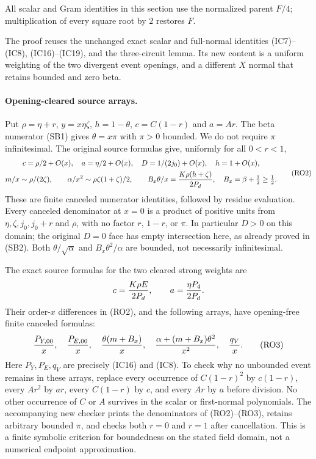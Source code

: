 All scalar and Gram identities in this section use the normalized
parent $F/4$; multiplication of every square root by $2$ restores $F$.

The proof reuses the unchanged exact scalar and full-normal identities
(IC7)--(IC8), (IC16)--(IC19), and the three-circuit lemma. Its new
content is a uniform weighting of the two divergent event openings,
and a different $X$ normal that retains bounded and zero beta.

\paragraph{Opening-cleared source arrays.}
Put $\rho=\eta+r$, $y=x\eta\zeta$, $h=1-\theta$,
$c=C(1-r)$ and $a=Ar$. The beta numerator (SB1) gives
$\theta=x\pi$ with $\pi>0$ bounded. We do not require $\pi$
infinitesimal. The original source formulas give, uniformly for
all $0<r<1$,
\[
\begin{gathered}
 c=\rho/2+O(x),\quad a=\eta/2+O(x),\quad
 D=1/(2j_0)+O(x),\quad h=1+O(x),\\
 m/x\sim\rho/(2\zeta),\qquad
 \alpha/x^2\sim\rho\zeta(1+\zeta)/2,\qquad
 B_x\theta/x={K\rho(h+\zeta)\over2P_d},\quad
 B_x=\beta+\tfrac12\ge\tfrac12.                      
\end{gathered} \tag{RO2}
\]
These are finite canceled numerator identities, followed by residue
evaluation. Every canceled denominator at $x=0$ is a product of
positive units from $\eta,\zeta,j_0,j_0+r$ and $\rho$, with no
factor $r$, $1-r$, or $\pi$. In particular $D>0$ on this domain;
the original $D=0$ face has empty intersection here, as already proved
in (SB2). Both $\theta/\sqrt\alpha$ and
$B_x\theta^2/\alpha$ are bounded, not necessarily infinitesimal.

The exact source formulas for the two cleared strong weights are
\[
 c={K\rho E\over2P_d},\qquad a={\eta P_4\over2P_d}.
\]
Their order-$x$ differences in (RO2), and the following arrays, have
opening-free finite canceled formulas:
\[
 {P_{Y,00}\over x},\quad {P_{E,00}\over x},\quad
 {\theta(m+B_x)\over x},\quad
 {\alpha+(m+B_x)\theta^2\over x^2},\quad {q_V\over x}.
                                                               \tag{RO3}
\]
Here $P_Y,P_E,q_V$ are precisely (IC16) and (IC8). To check why no
unbounded event remains in these arrays, replace every occurrence of
$C(1-r)^2$ by $c(1-r)$, every $Ar^2$ by $ar$, every
$C(1-r)$ by $c$, and every $Ar$ by $a$ before division. No other
occurrence of $C$ or $A$ survives in the scalar or first-normal
polynomials. The accompanying new checker prints the denominators of
(RO2)--(RO3), retains arbitrary bounded $\pi$, and checks both
$r=0$ and $r=1$ after cancellation. This is a finite symbolic
criterion for boundedness on the stated field domain, not a numerical
endpoint approximation.


